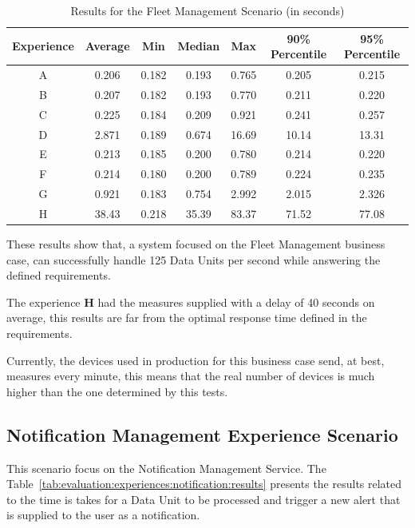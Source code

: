 \begin{table}[H]
    \caption{Results for the Fleet Management Scenario (in seconds)}
    \label{tab:evaluation:experiences:fleet:results}
    \centering
    \begin{tabular}{@{}ccccccc@{}}
    \toprule
    \textbf{Experience} & \textbf{Average} & \textbf{Min} & \textbf{Median} & \textbf{Max} & \textbf{90\% Percentile} & \textbf{95\% Percentile} \\ \midrule
    A & 0.206 & 0.182 & 0.193 & 0.765 & 0.205 & 0.215 \\ \midrule
    B & 0.207 & 0.182 & 0.193 & 0.770 & 0.211 & 0.220 \\ \midrule
    C & 0.225 & 0.184 & 0.209 & 0.921 & 0.241 & 0.257 \\ \midrule
    D & 2.871 & 0.189 & 0.674 & 16.69 & 10.14 & 13.31 \\ \midrule
    E & 0.213 & 0.185 & 0.200 & 0.780 & 0.214 & 0.220 \\ \midrule
    F & 0.214 & 0.180 & 0.200 & 0.789 & 0.224 & 0.235 \\ \midrule
    G & 0.921 & 0.183 & 0.754 & 2.992 & 2.015 & 2.326 \\ \midrule
    H & 38.43 & 0.218 & 35.39 & 83.37 & 71.52 & 77.08 \\ \bottomrule
    \end{tabular}
\end{table}

These results show that, a system focused on the Fleet Management business case, can successfully handle 125 Data Units per second while answering the defined requirements.

The experience \textbf{H} had the measures supplied with a delay of 40 seconds on average, this results are far from the optimal response time defined in the requirements.

Currently, the devices used in production for this business case send, at best, measures every minute, this means that the real number of devices is much higher than the one determined by this tests.

\subsection{Notification Management Experience Scenario}
\label{subsec:evaluation:experiences:notification}

This scenario focus on the Notification Management Service. The Table~\ref{tab:evaluation:experiences:notification:results} presents the results related to the time is takes for a Data Unit to be processed and trigger a new alert that is  supplied to the user as a notification.

